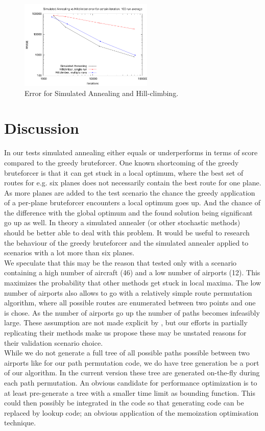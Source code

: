 \documentclass[journal]{IEEEtran}
\begin{document}
\begin{figure}[H]
\centering
\includegraphics[width=2.5in]{iterations_vs_error_sa_hc}
\caption{Error for Simulated Annealing and Hill-climbing.\tiny}
\label{fig:error_sa_hc}
\end{figure}

\section{Discussion}
In our tests simulated annealing either equals or underperforms in terms of score compared to the greedy bruteforcer. One known shortcoming of the greedy bruteforcer is that it can get stuck in a local optimum, where the best set of routes for e.g. six planes does not necessarily contain the best route for one plane. As more planes are added to the test scenario the chance the greedy application of a per-plane bruteforcer encounters a local optimum goes up. And the chance of the difference with the global optimum and the found solution being significant go up as well. In theory a simulated annealer (or other stochastic methods) should be better able to deal with this problem. It would be useful to research the behaviour of the greedy bruteforcer and the simulated annealer applied to scenarios with a lot more than six planes. \\
We speculate that this may be the reason that \cite{Mashford2001} tested only with a scenario containing a high number of aircraft (46) and a low number of airports (12). This maximizes the probability that other methods get stuck in local maxima. The low number of airports also allows \cite{Mashford2001} to go with a relatively simple route permutation algorithm, where all possible routes are enumerated between two points and one is chose. As the number of airports go up the number of paths becomes infeasibly large. These assumption are not made explicit by \cite{Mashford2001}, but our efforts in partially replicating their methods make us propose these may be unstated reasons for their validation scenario choice. \\
While we do not generate a full tree of all possible paths possible between two airports like \cite{Mashford2001} for our path permutation code, we do have tree generation be a port of our algorithm. In the current version these tree are generated on-the-fly during each path permutation. An obvious candidate for performance optimization is to at least pre-generate a tree with a smaller time limit as bounding function. This could then possibly be integrated in the code so that generating code can be replaced by lookup code; an obvious application of the memoization optimisation technique. \\
\end{document}
